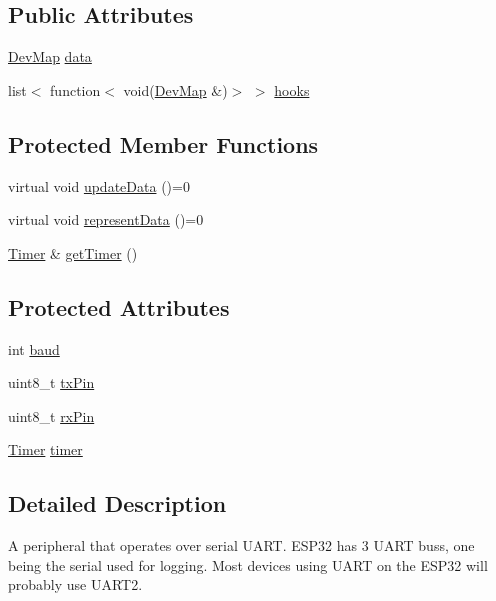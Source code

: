 \subsection*{Public Attributes}
\begin{DoxyCompactItemize}
\item 
\mbox{\hyperlink{Perif_8hpp_a358ff4ee6d24694ee7661f0cce14377e}{Dev\+Map}} \mbox{\hyperlink{classperif_1_1PerifBase_a1a3afaa535fda17e9f97123fffe78765}{data}}
\item 
list$<$ function$<$ void(\mbox{\hyperlink{Perif_8hpp_a358ff4ee6d24694ee7661f0cce14377e}{Dev\+Map}} \&)$>$ $>$ \mbox{\hyperlink{classperif_1_1PerifBase_a98964e5ca8384df64881265e0aa6d7b6}{hooks}}
\end{DoxyCompactItemize}
\subsection*{Protected Member Functions}
\begin{DoxyCompactItemize}
\item 
virtual void \mbox{\hyperlink{classperif_1_1Perif_a7c9b9c1af5300dc5c007f9559fefbffe}{update\+Data}} ()=0
\item 
virtual void \mbox{\hyperlink{classperif_1_1Perif_a556c780e9e4623aa6b7c3d167ef23e6b}{represent\+Data}} ()=0
\item 
\mbox{\hyperlink{classTimer}{Timer}} \& \mbox{\hyperlink{classperif_1_1Perif_a29c48598a861d85256c30e28af67f864}{get\+Timer}} ()
\end{DoxyCompactItemize}
\subsection*{Protected Attributes}
\begin{DoxyCompactItemize}
\item 
int \mbox{\hyperlink{classperif_1_1UARTPerif_a8d5c1c0ce1f1758392dc0145f0caade8}{baud}}
\item 
uint8\+\_\+t \mbox{\hyperlink{classperif_1_1UARTPerif_a338fb2e5db8bd91213b13524ac9d89aa}{tx\+Pin}}
\item 
uint8\+\_\+t \mbox{\hyperlink{classperif_1_1UARTPerif_a68a86b1e2ca06e42ef72fb4ca0792110}{rx\+Pin}}
\item 
\mbox{\hyperlink{classTimer}{Timer}} \mbox{\hyperlink{classperif_1_1Perif_acfa1256201bead82ccce1a0a8bcc24e1}{timer}}
\end{DoxyCompactItemize}


\subsection{Detailed Description}
A peripheral that operates over serial U\+A\+RT. E\+S\+P32 has 3 U\+A\+RT bus\textquotesingle{}s, one being the serial used for logging. Most devices using U\+A\+RT on the E\+S\+P32 will probably use U\+A\+R\+T2. 

